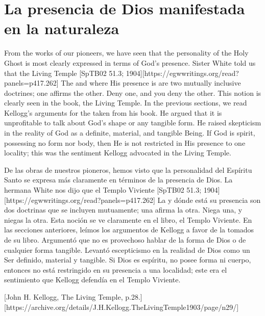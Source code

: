 \section*{La presencia de Dios manifestada en la naturaleza}


From the works of our pioneers, we have seen that the personality of the Holy Ghost is most clearly expressed in terms of God's presence. Sister White told us that the Living Temple [SpTB02 51.3; 1904][https://egwwritings.org/read?panels=p417.262] The  and where His presence is are two mutually inclusive doctrines; one affirms the other. Deny one, and you deny the other. This notion is clearly seen in the book, the Living Temple. In the previous sections, we read Kellogg's arguments for the  taken from his book. He argued that it is unprofitable to talk about God's shape or any tangible form. He raised skepticism in the reality of God as a definite, material, and tangible Being. If God is spirit, possessing no form nor body, then He is not restricted in His presence to one locality; this was the sentiment Kellogg advocated in the Living Temple.


De las obras de nuestros pioneros, hemos visto que la personalidad del Espíritu Santo se expresa más claramente en términos de la presencia de Dios. La hermana White nos dijo que el Templo Viviente [SpTB02 51.3; 1904][https://egwwritings.org/read?panels=p417.262] La  y dónde está su presencia son dos doctrinas que se incluyen mutuamente; una afirma la otra. Niega una, y niegas la otra. Esta noción se ve claramente en el libro, el Templo Viviente. En las secciones anteriores, leímos los argumentos de Kellogg a favor de la  tomados de su libro. Argumentó que no es provechoso hablar de la forma de Dios o de cualquier forma tangible. Levantó escepticismo en la realidad de Dios como un Ser definido, material y tangible. Si Dios es espíritu, no posee forma ni cuerpo, entonces no está restringido en su presencia a una localidad; este era el sentimiento que Kellogg defendía en el Templo Viviente.


[John H. Kellogg, The Living Temple, p.28.][https://archive.org/details/J.H.Kellogg.TheLivingTemple1903/page/n29/]


